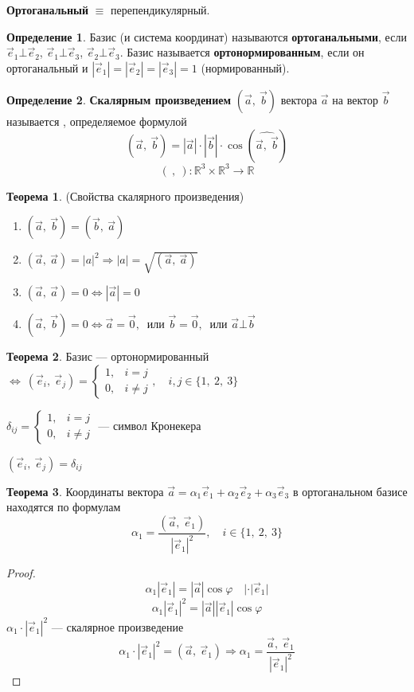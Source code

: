 \documentclass{article}
\theoremstyle{definition}
\newtheorem{definition}{Определение}
\newtheorem{theorem}{Теорема}[section]
\begin{document}
\textbf{Ортоганальный} $\equiv$ перепендикулярный.

\begin{definition}
Базис (и система координат) называются \textbf{ортоганальными}, если $\vec e_1 \bot \vec e_2$, $\vec e_1 \bot \vec e_3$, $\vec e_2 \bot \vec e_3$. 
Базис называется \textbf{ортонормированным}, если он ортоганальный и $|\vec e_1| = |\vec e_2| = |\vec e_3| = 1$ (нормированный).
\end{definition}

\begin{definition}
\textbf{Скалярным произведением} $(\vec a,\ \vec b)$ вектора $\vec a$ на вектор $\vec b$ называется , определяемое формулой
$$(\vec a,\ \vec b) = |\vec a|\cdot |\vec b|\cdot \cos{(\widehat{\vec a,\ \vec b})}$$
$$(\ ,\ ) : \mathbb{R}^3\times \mathbb{R}^3 \longrightarrow \mathbb{R}$$
\end{definition}

\begin{theorem}{(Свойства скалярного произведения)}
\begin{enumerate}
    \item $(\vec a,\ \vec b) = (\vec b,\ \vec a)$
    \item $(\vec a,\ \vec a) = |a|^2 \Longrightarrow |a| = \sqrt{(\vec a,\ \vec a)}$
    \item $(\vec a,\ \vec a) = 0 \Longleftrightarrow |\vec a| = 0$
    \item $(\vec a,\ \vec b) = 0 \Longleftrightarrow \vec a = \vec 0,\ \textrm{ или } \vec b = \vec 0,\ \textrm{ или } \vec a \bot \vec b$
\end{enumerate}
\end{theorem}

\begin{theorem}
Базис --- ортонормированный $\Longleftrightarrow\ (\vec e_i,\ \vec e_j) = \begin{cases}
1, & i=j\\
0, & i\neq j
\end{cases},\quad i,j\in\{1,\ 2,\ 3\}
$

$\delta_{ij} = \begin{cases}
1, & i=j\\
0, & i\neq j
\end{cases}$ --- символ Кронекера

$(\vec e_i,\ \vec e_j) = \delta_{ij}$
\end{theorem}

\begin{theorem}
Координаты вектора $\vec a = \alpha_1\vec e_1 + \alpha_2\vec e_2 + \alpha_3\vec e_3$ в ортоганальном базисе находятся по формулам
$$\alpha_1 = \dfrac{(\vec a,\ \vec e_1)}{|\vec e_1|^2},\quad i\in \{1,\ 2,\ 3\}$$
\begin{proof}
$$\alpha_1 |\vec e_1| = |\vec a|\cos{\varphi }\quad |\cdot |\vec e_1| $$
$$\alpha_1 |\vec e_1|^2 = |\vec a||\vec e_1|\cos{\varphi } $$
$\alpha_1\cdot |\vec e_1|^2$ --- скалярное произведение
$$\alpha_1\cdot |\vec e_1|^2 = (\vec a,\ \vec e_1) \Longrightarrow \alpha_1 = \dfrac{\vec a,\ \vec e_1}{|\vec e_1|^2}$$
\end{proof}
\end{theorem}
\end{document}
